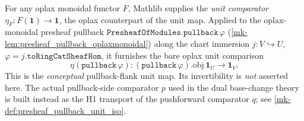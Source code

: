 \begin{definition}
  \label{mk-def:presheaf_pullback_unit_eta}
  \mathlibok

  For any oplax monoidal functor \(F\), Mathlib supplies the \emph{unit comparator}
  \(\eta_F : F(\mathbf 1) \to \mathbf 1\), the oplax counterpart of the unit map. Applied to the
  oplax-monoidal presheaf pullback \(\mathtt{PresheafOfModules.pullback}\,\varphi\)
  (\ref{mk-lem:presheaf_pullback_oplaxmonoidal}) along the chart immersion
  \(j : V \hookrightarrow U\), \(\varphi = j.\mathtt{toRingCatSheafHom}\), it furnishes the bare
  oplax unit comparison
  \[
    \eta(\mathtt{pullback}\,\varphi) :
      (\mathtt{pullback}\,\varphi).\mathrm{obj}\,\mathbf 1_U \longrightarrow \mathbf 1_V .
  \]
  This is the \emph{conceptual} pullback-flank unit map. Its invertibility is \emph{not} asserted
  here. The actual pullback-side comparator \(p\) used in the dual base-change theory is built
  instead as
  the H1 transport of the pushforward comparator \(q\); see
  \ref{mk-def:presheaf_pullback_unit_iso}.
\end{definition}

